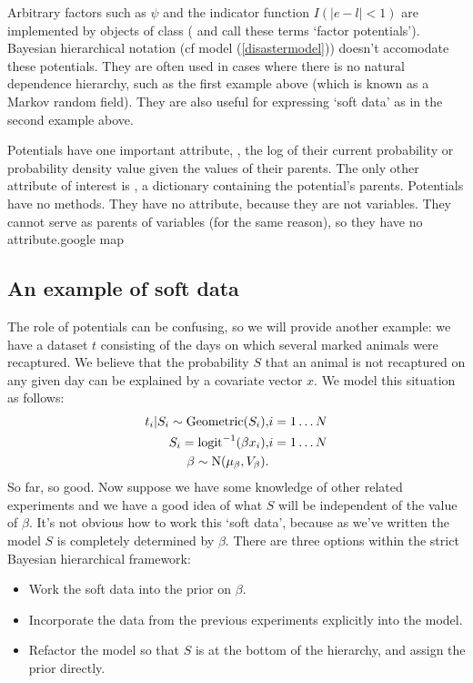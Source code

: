 Arbitrary factors such as $\psi$ and the indicator function $I(|e-l|<1)$ are
implemented by objects of class  (\cite{dawidmarkov} and
\cite{Jordan:2004p5439} call these terms `factor potentials'). Bayesian
hierarchical notation (cf model (\ref{disastermodel})) doesn't accomodate these
potentials. They are often used in cases where there is no natural dependence
hierarchy, such as the first example above (which is known as a Markov random
field). They are also useful for expressing `soft data'
\citep{Christakos:2002p5506} as in the second example above.


\bigskip
Potentials have one important attribute, , the log of their current probability or probability density value given the values of their parents. The only other attribute of interest is , a dictionary containing the potential's parents. Potentials have no methods. They have no  attribute, because they are not variables. They cannot serve as parents of variables (for the same reason), so they have no  attribute.google map

\subsection{An example of soft data}
The role of potentials can be confusing, so we will provide another example: we have a dataset $t$ consisting of the days on which several marked animals were recaptured. We believe that the probability $S$ that an animal is not recaptured on any given day can be explained by a covariate vector $x$. We model this situation as follows:
\begin{eqnarray*}
    t_i|S_i \sim \textup{Geometric}(S_i), & i=1\ldots N\\
    S_i = \textup{logit}^{-1}(\beta x_i), &i=1\ldots N\\
    \beta\sim \textup{N}(\mu_\beta, V_\beta).
\end{eqnarray*}
So far, so good. Now suppose we have some knowledge of other related experiments and we have a good idea of what $S$ will be independent of the value of $\beta$. It's not obvious how to work this `soft data', because as we've written the model $S$ is completely determined by $\beta$. There are three options within the strict Bayesian hierarchical framework:
\begin{itemize}
    \item Work the soft data into the prior on $\beta$.
    \item Incorporate the data from the previous experiments explicitly into the model.
    \item Refactor the model so that $S$ is at the bottom of the hierarchy, and assign the prior directly.
\end{itemize}

